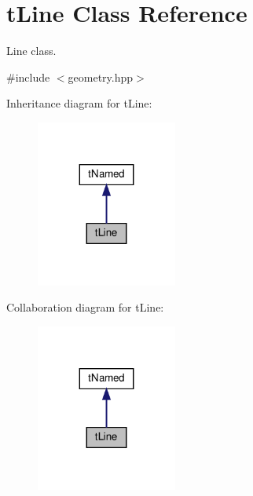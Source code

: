 \hypertarget{classtLine}{}\section{t\+Line Class Reference}
\label{classtLine}


Line class.  




{\ttfamily \#include $<$geometry.\+hpp$>$}



Inheritance diagram for t\+Line\+:
\nopagebreak
\begin{figure}[H]
\begin{center}
\leavevmode
\includegraphics[width=131pt]{classtLine__inherit__graph}
\end{center}
\end{figure}


Collaboration diagram for t\+Line\+:
\nopagebreak
\begin{figure}[H]
\begin{center}
\leavevmode
\includegraphics[width=131pt]{classtLine__coll__graph}
\end{center}
\end{figure}
